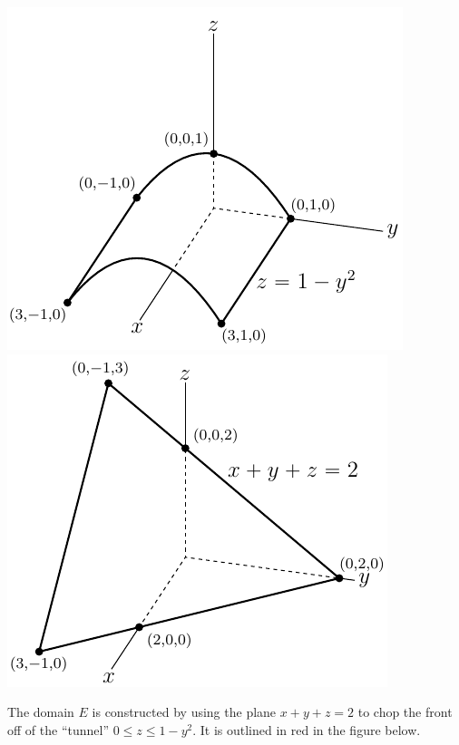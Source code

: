 \begin{solution}
\begin{itemize}
\end{itemize}
\begin{center}
     \includegraphics{fig/OE05D_9a.pdf}\quad
     \includegraphics{fig/OE05D_9b.pdf}
\end{center}
The domain $E$ is constructed by using the plane $x+y+z=2$
to chop the front off of the ``tunnel'' $0\le z\le 1-y^2$.
It is outlined in red in the figure below.


\end{solution}
